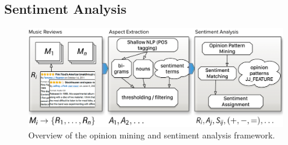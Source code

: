 


\subsection{Sentiment Analysis}\label{sec:musicology:sentiment}

\begin{figure}
\includegraphics[width=\columnwidth]{ch05_musicology_pics/omf}
\caption{Overview of the opinion mining and sentiment analysis framework.}
\label{fig:musicology:OMF}
\end{figure}

